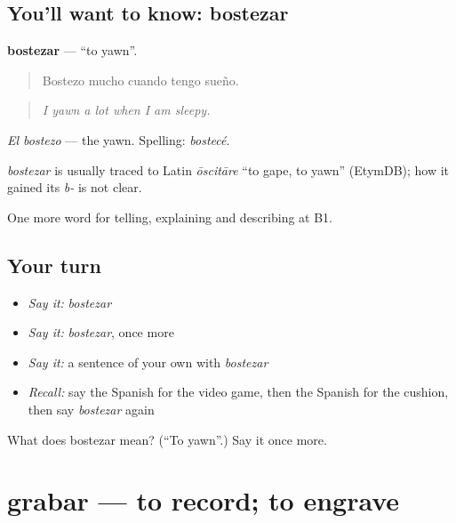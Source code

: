 \subsection*{You'll want to know: bostezar}
\textbf{bostezar} — \textquotedblleft{}to yawn\textquotedblright{}.

\begin{quote}
Bostezo mucho cuando tengo sueño.
\end{quote}

\begin{quote}
\emph{I yawn a lot when I am sleepy.}
\end{quote}

\emph{El bostezo} — the yawn. Spelling: \emph{bostecé}.

\begin{cousinweb}
\emph{bostezar} is usually traced to Latin \emph{ōscitāre} \textquotedblleft{}to gape, to yawn\textquotedblright{} (EtymDB); how it gained its \emph{b-} is not clear.
\end{cousinweb}

\begin{grammarlens}[title={What you've built}]
One more word for telling, explaining and describing at B1.
\end{grammarlens}

\subsection*{Your turn}
\begin{itemize}
\raggedright
  \item \emph{Say it:} \emph{bostezar}
  \item \emph{Say it:} \emph{bostezar}, once more
  \item \emph{Say it:} a sentence of your own with \emph{bostezar}
  \item \emph{Recall:} say the Spanish for the video game, then the Spanish for the cushion, then say \emph{bostezar} again
\end{itemize}

\begin{tcolorbox}[breakable,colback=teal!4,colframe=teal!35!black,title={Before you move on}]
What does bostezar mean? (\textquotedblleft{}To yawn\textquotedblright{}.) Say it once more.
\end{tcolorbox}
\section[grabar]{grabar — to record; to engrave}

